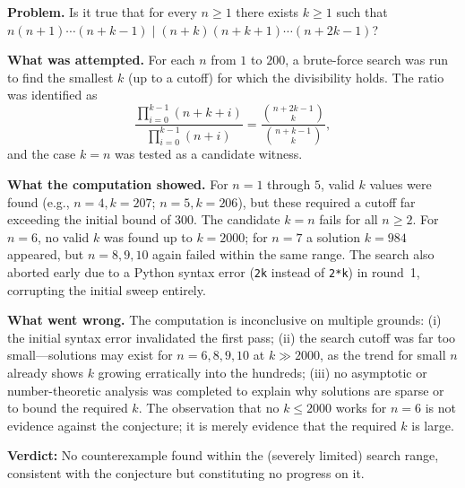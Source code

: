 \documentclass[11pt]{article}
\begin{document}
\textbf{Problem.} Is it true that for every $n \geq 1$ there exists $k \geq 1$ such that
$n(n+1)\cdots(n+k-1) \mid (n+k)(n+k+1)\cdots(n+2k-1)$?

\textbf{What was attempted.} For each $n$ from $1$ to $200$, a brute-force search was run to find the smallest $k$ (up to a cutoff) for which the divisibility holds. The ratio was identified as
\[
\frac{\prod_{i=0}^{k-1}(n+k+i)}{\prod_{i=0}^{k-1}(n+i)} = \frac{\binom{n+2k-1}{k}}{\binom{n+k-1}{k}},
\]
and the case $k = n$ was tested as a candidate witness.

\textbf{What the computation showed.} For $n = 1$ through $5$, valid $k$ values were found (e.g., $n=4, k=207$; $n=5, k=206$), but these required a cutoff far exceeding the initial bound of $300$. The candidate $k = n$ fails for all $n \geq 2$. For $n = 6$, no valid $k$ was found up to $k = 2000$; for $n = 7$ a solution $k = 984$ appeared, but $n = 8, 9, 10$ again failed within the same range. The search also aborted early due to a Python syntax error (\texttt{2k} instead of \texttt{2*k}) in round~1, corrupting the initial sweep entirely.

\textbf{What went wrong.} The computation is inconclusive on multiple grounds: (i) the initial syntax error invalidated the first pass; (ii) the search cutoff was far too small---solutions may exist for $n = 6, 8, 9, 10$ at $k \gg 2000$, as the trend for small $n$ already shows $k$ growing erratically into the hundreds; (iii) no asymptotic or number-theoretic analysis was completed to explain why solutions are sparse or to bound the required $k$. The observation that no $k \leq 2000$ works for $n = 6$ is not evidence against the conjecture; it is merely evidence that the required $k$ is large.

\textbf{Verdict:} No counterexample found within the (severely limited) search range, consistent with the conjecture but constituting no progress on it.
\end{document}
